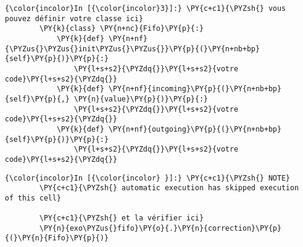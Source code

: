     \begin{Verbatim}[commandchars=\\\{\}]
{\color{incolor}In [{\color{incolor}3}]:} \PY{c+c1}{\PYZsh{} vous pouvez définir votre classe ici}
        \PY{k}{class} \PY{n+nc}{Fifo}\PY{p}{:}
            \PY{k}{def} \PY{n+nf}{\PYZus{}\PYZus{}init\PYZus{}\PYZus{}}\PY{p}{(}\PY{n+nb+bp}{self}\PY{p}{)}\PY{p}{:}
                \PY{l+s+s2}{\PYZdq{}}\PY{l+s+s2}{votre code}\PY{l+s+s2}{\PYZdq{}}
            \PY{k}{def} \PY{n+nf}{incoming}\PY{p}{(}\PY{n+nb+bp}{self}\PY{p}{,} \PY{n}{value}\PY{p}{)}\PY{p}{:}
                \PY{l+s+s2}{\PYZdq{}}\PY{l+s+s2}{votre code}\PY{l+s+s2}{\PYZdq{}}
            \PY{k}{def} \PY{n+nf}{outgoing}\PY{p}{(}\PY{n+nb+bp}{self}\PY{p}{)}\PY{p}{:}
                \PY{l+s+s2}{\PYZdq{}}\PY{l+s+s2}{votre code}\PY{l+s+s2}{\PYZdq{}}
\end{Verbatim}


    \begin{Verbatim}[commandchars=\\\{\}]
{\color{incolor}In [{\color{incolor} }]:} \PY{c+c1}{\PYZsh{} NOTE}
        \PY{c+c1}{\PYZsh{} automatic execution has skipped execution of this cell}
        
        \PY{c+c1}{\PYZsh{} et la vérifier ici}
        \PY{n}{exo\PYZus{}fifo}\PY{o}{.}\PY{n}{correction}\PY{p}{(}\PY{n}{Fifo}\PY{p}{)}
\end{Verbatim}



    
    
    

